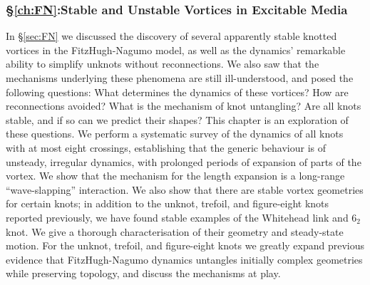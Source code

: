 \subsubsection{\S \ref{ch:FN}:Stable and Unstable Vortices in Excitable Media}
In \S \ref{sec:FN} we discussed the discovery of several apparently stable knotted vortices in the FitzHugh-Nagumo model, as well as the dynamics' remarkable ability to simplify unknots without reconnections. We also saw that the mechanisms underlying these phenomena are still ill-understood, and posed the following questions: What determines the dynamics of these vortices? How are reconnections avoided? What is the mechanism of knot untangling? Are all knots stable, and if so can we predict their shapes? This chapter is an exploration of these questions. We perform a systematic survey of the dynamics of all knots with at most eight crossings, establishing that the generic behaviour is of unsteady, irregular dynamics, with prolonged periods of expansion of parts of the vortex. We show that the mechanism for the length expansion is a long-range “wave-slapping” interaction. We also show that there are stable vortex geometries for certain knots; in addition to the unknot, trefoil, and figure-eight knots reported previously, we have found stable examples of the Whitehead link and $6_2$ knot. We give a thorough characterisation of their geometry and steady-state motion. For the unknot, trefoil, and figure-eight knots we greatly expand previous evidence that FitzHugh-Nagumo dynamics untangles initially complex geometries while preserving topology, and discuss the mechanisms at play.






